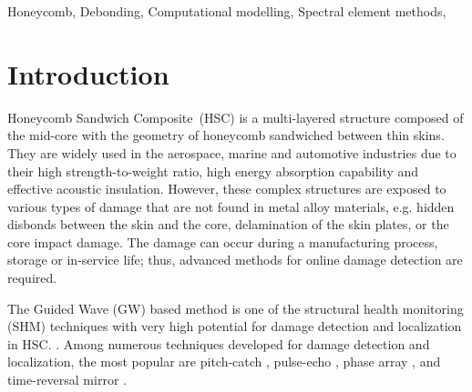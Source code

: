 \documentclass[a4paper,fleqn]{cas-sc}
\begin{document}
\begin{abstract}[S U M M A R Y]
	This study aims to assess the debonding of the carbon skin from the honeycomb core in the sandwich panel based on guided wave propagation.
	The effect of damage on wave propagation in the slab was determined using numerical simulations.
	The two most common honeycomb core models found in the literature are a homogenized, orthogonal continuous medium and a real geometry core modelled by finite elements, usually using commercial software.
	In a simplified model, the results are in good agreement only for low frequencies.
	In this paper, the panel has been modelled by the time-domain spectral element method taking into account the real geometry of the honeycomb core.
	
	The presented model was compared with the homogenized model of the 
	The result of the parametric study is a function of damage influence on the amplitude of propagating waves.
\end{abstract}
\begin{keywords}
Honeycomb, Debonding, Computational modelling, Spectral element methods, 
\end{keywords}

\maketitle

\section{Introduction}
\label{sec:intro}
Honeycomb Sandwich Composite~(HSC) is a multi-layered structure composed of the mid-core with the geometry of honeycomb sandwiched between thin skins.
They are widely used in the aerospace, marine and automotive industries due to their high strength-to-weight ratio, high energy absorption capability and effective acoustic insulation.
However, these complex structures are exposed to various types of damage that are not found in metal alloy materials, e.g. hidden disbonds between the skin and the core, delamination of the skin plates, or the core impact damage.
The damage can occur during a manufacturing process, storage or in-service life; thus, advanced methods for online damage detection are required.

The Guided Wave (GW) based method is one of the structural health monitoring (SHM) techniques with very high potential for damage detection and localization in HSC. \cite{mustapha2011assessment, sikdar2016guided, sikdar2016ultrasonic,radzienski2016assessment, yu2019core}.
Among numerous techniques developed for damage detection and localization, the most popular are pitch-catch \cite{sikdar2017structural}, pulse-echo \cite{}, phase array \cite{lu2006crack, ostachowicz2008elastic}, and time-reversal mirror \cite{fink1992time, eremin2016analytically}.
\end{document}
